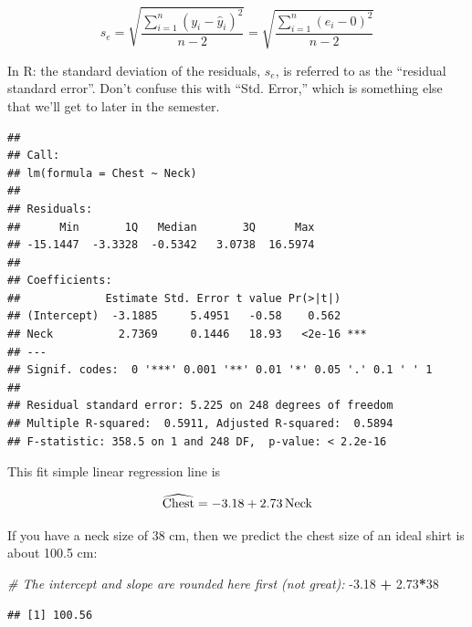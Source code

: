 \documentclass[
]{book}
\newenvironment{Shaded}{\begin{snugshade}}{\end{snugshade}}
\newcommand{\CommentTok}[1]{\textcolor[rgb]{0.56,0.35,0.01}{\textit{#1}}}
\newcommand{\DataTypeTok}[1]{\textcolor[rgb]{0.13,0.29,0.53}{#1}}
\newcommand{\DecValTok}[1]{\textcolor[rgb]{0.00,0.00,0.81}{#1}}
\newcommand{\FloatTok}[1]{\textcolor[rgb]{0.00,0.00,0.81}{#1}}
\newcommand{\KeywordTok}[1]{\textcolor[rgb]{0.13,0.29,0.53}{\textbf{#1}}}
\newcommand{\NormalTok}[1]{#1}
\newcommand{\OperatorTok}[1]{\textcolor[rgb]{0.81,0.36,0.00}{\textbf{#1}}}
\newcommand{\StringTok}[1]{\textcolor[rgb]{0.31,0.60,0.02}{#1}}
\begin{document}
\[s_e = \sqrt{\frac{\sum^n_{i=1} (y_i-\hat{y}_i)^2}{n-2}}  = \sqrt{\frac{\sum^n_{i=1} (e_i-0)^2}{n-2}} \]

In R: the standard deviation of the residuals, \(s_e\), is referred to as the ``residual standard error''. Don't confuse this with ``Std. Error,'' which is something else that we'll get to later in the semester.

\begin{Shaded}
\end{Shaded}

\begin{verbatim}
## 
## Call:
## lm(formula = Chest ~ Neck)
## 
## Residuals:
##      Min       1Q   Median       3Q      Max 
## -15.1447  -3.3328  -0.5342   3.0738  16.5974 
## 
## Coefficients:
##             Estimate Std. Error t value Pr(>|t|)    
## (Intercept)  -3.1885     5.4951   -0.58    0.562    
## Neck          2.7369     0.1446   18.93   <2e-16 ***
## ---
## Signif. codes:  0 '***' 0.001 '**' 0.01 '*' 0.05 '.' 0.1 ' ' 1
## 
## Residual standard error: 5.225 on 248 degrees of freedom
## Multiple R-squared:  0.5911,	Adjusted R-squared:  0.5894 
## F-statistic: 358.5 on 1 and 248 DF,  p-value: < 2.2e-16
\end{verbatim}

This fit simple linear regression line is

\[ \widehat{\hbox{Chest}} = -3.18 + 2.73\,\hbox{Neck}\]

If you have a neck size of 38 cm, then we predict the chest size of an ideal shirt is about 100.5 cm:

\begin{Shaded}
\begin{Highlighting}[]
\CommentTok{# The intercept and slope are rounded here first (not great):}
\FloatTok{-3.18} \OperatorTok{+}\StringTok{ }\FloatTok{2.73}\OperatorTok{*}\DecValTok{38}
\end{Highlighting}
\end{Shaded}

\begin{verbatim}
## [1] 100.56
\end{verbatim}

\begin{Shaded}
\end{Shaded}
\end{document}
